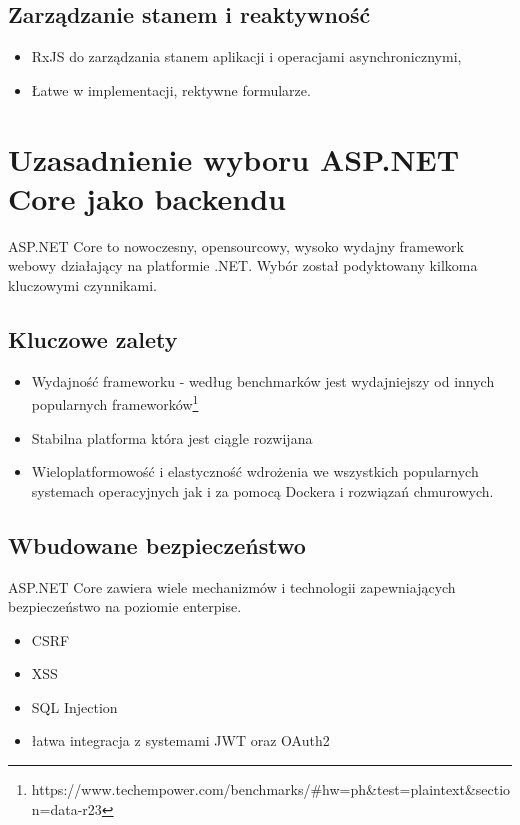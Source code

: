 \subsection{Zarządzanie stanem i reaktywność}
\begin{itemize}
	\item RxJS do zarządzania stanem aplikacji i operacjami asynchronicznymi,
	\item Łatwe w implementacji, rektywne formularze.
\end{itemize}

\section{Uzasadnienie wyboru ASP.NET Core jako backendu}

ASP.NET Core to nowoczesny, opensourcowy, wysoko wydajny framework webowy działający na platformie .NET.
Wybór został podyktowany kilkoma kluczowymi czynnikami.

\subsection{Kluczowe zalety}
\begin{itemize}
	\item Wydajność frameworku - według benchmarków jest wydajniejszy od innych popularnych frameworków\footnote{https://www.techempower.com/benchmarks/\#hw=ph\&test=plaintext\&section=data-r23}
	\item Stabilna platforma która jest ciągle rozwijana
	\item Wieloplatformowość i elastyczność wdrożenia we wszystkich popularnych systemach operacyjnych jak i za pomocą Dockera i rozwiązań chmurowych.
\end{itemize}

\subsection{Wbudowane bezpieczeństwo}
ASP.NET Core zawiera wiele mechanizmów i technologii zapewniających bezpieczeństwo na poziomie enterpise.
\begin{itemize}
	\item CSRF
	\item XSS
	\item SQL Injection
	\item łatwa integracja z systemami JWT oraz OAuth2
\end{itemize}

